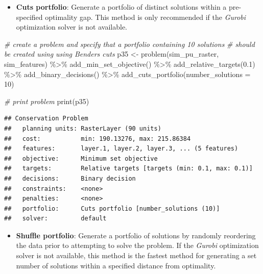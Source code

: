 \documentclass[
  12pt,
]{book}
\newenvironment{Shaded}{\begin{snugshade}}{\end{snugshade}}
\newcommand{\AttributeTok}[1]{\textcolor[rgb]{0.77,0.63,0.00}{#1}}
\newcommand{\CommentTok}[1]{\textcolor[rgb]{0.56,0.35,0.01}{\textit{#1}}}
\newcommand{\DecValTok}[1]{\textcolor[rgb]{0.00,0.00,0.81}{#1}}
\newcommand{\FloatTok}[1]{\textcolor[rgb]{0.00,0.00,0.81}{#1}}
\newcommand{\FunctionTok}[1]{\textcolor[rgb]{0.00,0.00,0.00}{#1}}
\newcommand{\NormalTok}[1]{#1}
\newcommand{\OtherTok}[1]{\textcolor[rgb]{0.56,0.35,0.01}{#1}}
\newcommand{\SpecialCharTok}[1]{\textcolor[rgb]{0.00,0.00,0.00}{#1}}
\providecommand{\tightlist}{%
  \setlength{\itemsep}{0pt}\setlength{\parskip}{0pt}}
\begin{document}
\begin{itemize}
\tightlist
\item
  \textbf{Cuts portfolio}: Generate a portfolio of distinct solutions within a pre-specified optimality gap. This method is only recommended if the \emph{Gurobi} optimization solver is not available.
\end{itemize}

\begin{Shaded}
\begin{Highlighting}[]
\CommentTok{\# create a problem and specify that a portfolio containing 10 solutions}
\CommentTok{\# should be created using using Bender\textquotesingle{}s cuts}
\NormalTok{p35 }\OtherTok{\textless{}{-}} \FunctionTok{problem}\NormalTok{(sim\_pu\_raster, sim\_features) }\SpecialCharTok{\%\textgreater{}\%}
  \FunctionTok{add\_min\_set\_objective}\NormalTok{() }\SpecialCharTok{\%\textgreater{}\%}
  \FunctionTok{add\_relative\_targets}\NormalTok{(}\FloatTok{0.1}\NormalTok{) }\SpecialCharTok{\%\textgreater{}\%}
  \FunctionTok{add\_binary\_decisions}\NormalTok{() }\SpecialCharTok{\%\textgreater{}\%}
  \FunctionTok{add\_cuts\_portfolio}\NormalTok{(}\AttributeTok{number\_solutions =} \DecValTok{10}\NormalTok{)}

\CommentTok{\# print problem}
\FunctionTok{print}\NormalTok{(p35)}
\end{Highlighting}
\end{Shaded}

\begin{verbatim}
## Conservation Problem
##   planning units: RasterLayer (90 units)
##   cost:           min: 190.13276, max: 215.86384
##   features:       layer.1, layer.2, layer.3, ... (5 features)
##   objective:      Minimum set objective 
##   targets:        Relative targets [targets (min: 0.1, max: 0.1)]
##   decisions:      Binary decision 
##   constraints:    <none>
##   penalties:      <none>
##   portfolio:      Cuts portfolio [number_solutions (10)]
##   solver:         default
\end{verbatim}

\begin{itemize}
\tightlist
\item
  \textbf{Shuffle portfolio}: Generate a portfolio of solutions by randomly reordering the data prior to attempting to solve the problem. If the \emph{Gurobi} optimization solver is not available, this method is the fastest method for generating a set number of solutions within a specified distance from optimality.
\end{itemize}
\end{document}
